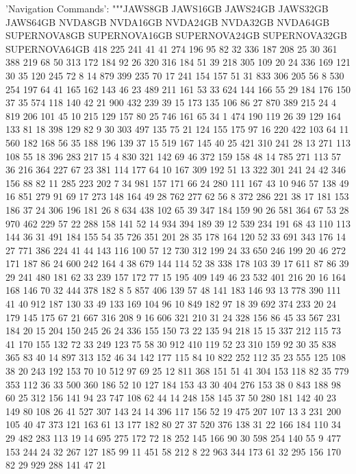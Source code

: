 \begin{pyverbatim}
{    'Navigation Commands': """JAWS8GB	JAWS16GB	JAWS24GB	JAWS32GB	JAWS64GB	NVDA8GB	NVDA16GB	NVDA24GB	NVDA32GB	NVDA64GB	SUPERNOVA8GB	SUPERNOVA16GB	SUPERNOVA24GB	SUPERNOVA32GB	SUPERNOVA64GB
418	225	241	41	41	274	196	95	82	32	336	187	208	25	30
361	388	219	68	50	313	172	184	92	26	320	316	184	51	39
218	305	109	20	24	336	169	121	30	35	120	245	72	8	14
879	399	235	70	17	241	154	157	51	31	833	306	205	56	8
530	254	197	64	41	165	162	143	46	23	489	211	161	53	33
624	144	166	55	29	184	176	150	37	35	574	118	140	42	21
900	432	239	39	15	173	135	106	86	27	870	389	215	24	4
819	206	101	45	10	215	129	157	80	25	746	161	65	34	1
474	190	119	26	39	129	164	133	81	18	398	129	82	9	30
303	497	135	75	21	124	155	175	97	16	220	422	103	64	11
560	182	168	56	35	188	196	139	37	15	519	167	145	40	25
421	310	241	28	13	271	113	108	55	18	396	283	217	15	4
830	321	142	69	46	372	159	158	48	14	785	271	113	57	36
216	364	227	67	23	381	114	177	64	10	167	309	192	51	13
322	301	241	24	42	346	156	88	82	11	285	223	202	7	34
981	157	171	66	24	280	111	167	43	10	946	57	138	49	16
851	279	91	69	17	273	148	164	49	28	762	277	62	56	8
372	286	221	38	17	181	153	186	37	24	306	196	181	26	8
634	438	102	65	39	347	184	159	90	26	581	364	67	53	28
970	462	229	57	22	288	158	141	52	14	934	394	189	39	12
539	234	191	68	43	110	113	144	36	31	491	184	155	54	35
726	351	201	28	35	178	164	120	52	33	691	343	176	14	27
771	386	224	41	44	143	116	100	57	12	730	312	199	24	33
650	246	199	20	46	272	171	187	86	24	600	242	164	4	38
679	144	114	52	38	338	178	103	39	17	611	87	86	39	29
241	480	181	62	33	239	157	172	77	15	195	409	149	46	23
532	401	216	20	16	164	168	146	70	32	444	378	182	8	5
857	406	139	57	48	141	183	146	93	13	778	390	111	41	40
912	187	130	33	49	133	169	104	96	10	849	182	97	18	39
692	374	233	20	24	179	145	175	67	21	667	316	208	9	16
606	321	210	31	24	328	156	86	45	33	567	231	184	20	15
204	150	245	26	24	336	155	150	73	22	135	94	218	15	15
337	212	115	73	41	170	155	132	72	33	249	123	75	58	30
912	410	119	52	23	310	159	92	30	35	838	365	83	40	14
897	313	152	46	34	142	177	115	84	10	822	252	112	35	23
555	125	108	38	20	243	192	153	70	10	512	97	69	25	12
811	368	151	51	41	304	153	118	82	35	779	353	112	36	33
500	360	186	52	10	127	184	153	43	30	404	276	153	38	0
843	188	98	60	25	312	156	141	94	23	747	108	62	44	14
248	158	145	37	50	280	181	142	40	23	149	80	108	26	41
527	307	143	24	14	396	117	156	52	19	475	207	107	13	3
231	200	105	40	47	373	121	163	61	13	177	182	80	27	37
520	376	138	31	22	166	184	110	34	29	482	283	113	19	14
695	275	172	72	18	252	145	166	90	30	598	254	140	55	9
477	153	244	24	32	267	127	185	99	11	451	58	212	8	22
963	344	173	61	32	295	156	170	82	29	929	288	141	47	21
}
\end{pyverbatim}

